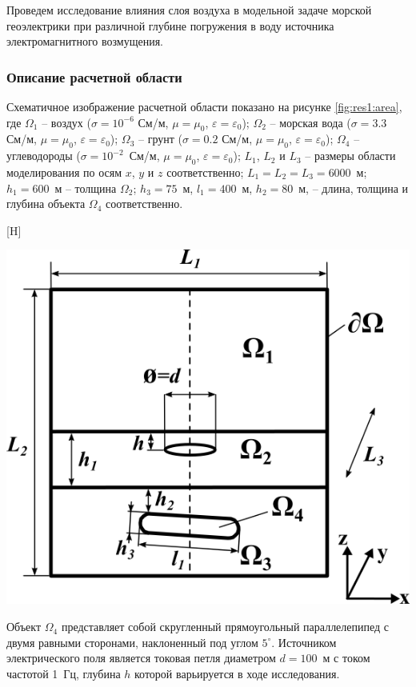 \documentclass[a4paper,14pt]{article}
\makeatletter
\renewenvironment{figure}[1][\fps@figure]{
  \edef\@tempa{\noexpand\@float{figure}[#1]}
  \@tempa
  \addtocounter{foofigure}{1}
}{
  \end@float
}
\makeatother
\begin{document}
Проведем исследование влияния слоя воздуха в модельной задаче морской геоэлектрики при различной глубине погружения в воду источника электромагнитного возмущения.

\subsubsection{Описание расчетной области}
Схематичное изображение расчетной области показано на рисунке \ref{fig:res1:area}, где $\Omega_1$ – воздух ($\sigma=10^{-6}$ См/м, $\mu=\mu_0$, $\varepsilon=\varepsilon_0$); $\Omega_2$ – морская вода ($\sigma=3.3$ См/м, $\mu=\mu_0$, $\varepsilon=\varepsilon_0$); $\Omega_3$ – грунт ($\sigma=0.2$ См/м, $\mu=\mu_0$, $\varepsilon=\varepsilon_0$); $\Omega_4$ – углеводороды ($\sigma=10^{-2}$~См/м, $\mu=\mu_0$, $\varepsilon=\varepsilon_0$); $L_1$, $L_2$ и $L_3$ -- размеры области моделирования по осям $x$, $y$ и $z$ соответственно; $L_1 = L_2 = L_3 = 6000$~м; $h_1=600$~м -- толщина $\Omega_2$; $h_3=75$~м, $l_1=400$~м, $h_2=80$~м, -- длина, толщина и глубина объекта $\Omega_4$ соответственно.

\begin{figure}[H]
	\centering
	\includegraphics[scale=0.5]{research-1/area_3layers_shift_3.png}
	\caption{схематичное изображение расчетной области}
	\label{fig:res1:area}
\end{figure}

\noindent Объект $\Omega_4$ представляет собой скругленный прямоугольный параллелепипед с двумя равными сторонами, наклоненный под углом $5^{\circ}$. Источником электрического поля является токовая петля диаметром $d=100$~м с током частотой 1~Гц, глубина $h$ которой варьируется в ходе исследования.
\end{document}

